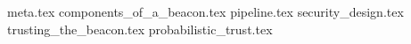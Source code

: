 {meta.tex}
{components_of_a_beacon.tex}
{pipeline.tex}
{security_design.tex}
{trusting_the_beacon.tex}
{probabilistic_trust.tex}
